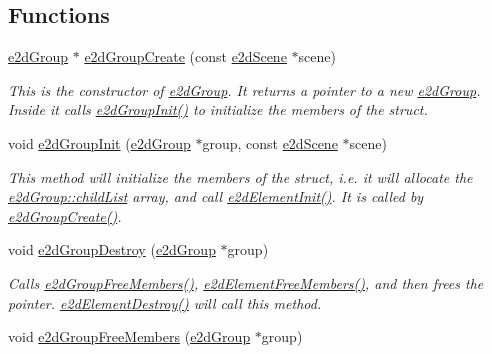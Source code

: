 \subsection*{Functions}
\begin{DoxyCompactItemize}
\item 
\hyperlink{structe2dGroup}{e2d\-Group} $\ast$ \hyperlink{group__e2dGroup_gaea870c0efafe302d65baaec0b028c6fb}{e2d\-Group\-Create} (const \hyperlink{structe2dScene}{e2d\-Scene} $\ast$scene)
\begin{DoxyCompactList}\small\item\em This is the constructor of \hyperlink{structe2dGroup}{e2d\-Group}. It returns a pointer to a new \hyperlink{structe2dGroup}{e2d\-Group}. Inside it calls \hyperlink{group__e2dGroup_ga25406e9ff8a7746af03833e40ccf259a}{e2d\-Group\-Init()} to initialize the members of the struct. \end{DoxyCompactList}\item 
void \hyperlink{group__e2dGroup_ga25406e9ff8a7746af03833e40ccf259a}{e2d\-Group\-Init} (\hyperlink{structe2dGroup}{e2d\-Group} $\ast$group, const \hyperlink{structe2dScene}{e2d\-Scene} $\ast$scene)
\begin{DoxyCompactList}\small\item\em This method will initialize the members of the struct, i.\-e. it will allocate the \hyperlink{structe2dGroup_a55f6dde874716dc99dcd270fc0999a01}{e2d\-Group\-::child\-List} array, and call \hyperlink{group__e2dElement_ga8734d10ef40a380dfc51bfe1790a92a7}{e2d\-Element\-Init()}. It is called by \hyperlink{group__e2dGroup_gaea870c0efafe302d65baaec0b028c6fb}{e2d\-Group\-Create()}. \end{DoxyCompactList}\item 
void \hyperlink{group__e2dGroup_ga545626effa0f89b72f244e56aadb05bc}{e2d\-Group\-Destroy} (\hyperlink{structe2dGroup}{e2d\-Group} $\ast$group)
\begin{DoxyCompactList}\small\item\em Calls \hyperlink{group__e2dGroup_ga9569da6e74703187306878ec830d52c4}{e2d\-Group\-Free\-Members()}, \hyperlink{group__e2dElement_gae8da5104d70a09549ca74044dda8313c}{e2d\-Element\-Free\-Members()}, and then frees the pointer. \hyperlink{group__e2dElement_ga214c437a16fe6f3fc795539f851a2019}{e2d\-Element\-Destroy()} will call this method. \end{DoxyCompactList}\item 
void \hyperlink{group__e2dGroup_ga9569da6e74703187306878ec830d52c4}{e2d\-Group\-Free\-Members} (\hyperlink{structe2dGroup}{e2d\-Group} $\ast$group)

\end{DoxyCompactItemize}
